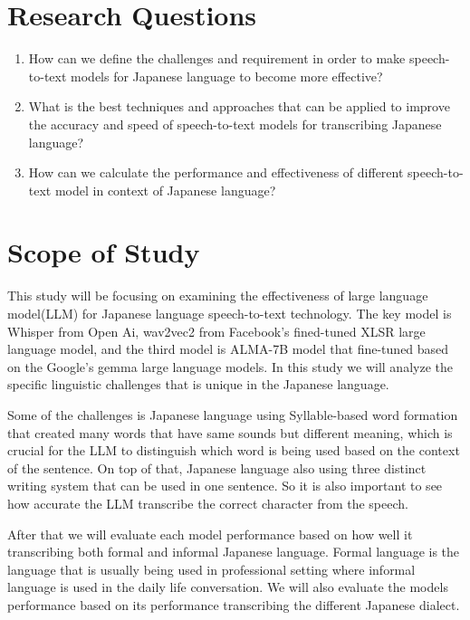 \section{Research Questions}
\begin{enumerate}
    \item How can we define the challenges and requirement in order to make speech-to-text models for Japanese language to become more effective?
    
    \item What is the best techniques and approaches that can be applied to improve the accuracy and speed of speech-to-text models for transcribing Japanese language?

    \item How can we calculate the performance and effectiveness of different speech-to-text model in context of Japanese language?
\end{enumerate}


\section{Scope of Study}
This study will be focusing on examining the effectiveness of large language model(LLM) for Japanese language speech-to-text technology. The key model is Whisper from Open Ai, wav2vec2 from Facebook's fined-tuned XLSR large language model, and the third model is ALMA-7B model that fine-tuned based on the Google's gemma large language models. In this study we will analyze the specific linguistic challenges that is unique in the Japanese language. 

Some of the challenges is Japanese language using Syllable-based word formation that created many words that have same sounds but different meaning, which is crucial for the LLM to distinguish which word is being used based on the context of the sentence. On top of that, Japanese language also using three distinct writing system that can be used in one sentence. So it is also important to see how accurate the LLM transcribe the correct character from the speech. 

After that we will evaluate each model performance based on how well it  transcribing both formal and informal Japanese language. Formal language is the language that is usually being used in professional setting where informal language is used in the daily life conversation. We will also evaluate the models performance based on its performance transcribing the different Japanese dialect. 

